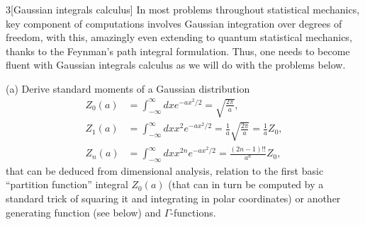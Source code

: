 \documentclass[12pt]{article}
\begin{document}
\begin{problem}{3}[Gaussian integrals calculus]
In most problems throughout statistical mechanics, key component of computations
involves Gaussian integration over degrees of freedom, with this, amazingly even
extending to quantum statistical mechanics, thanks to the Feynman's path
integral formulation. Thus, one needs to become fluent with Gaussian integrals
calculus as we will do with the problems below.

(a) Derive standard moments of a Gaussian distribution
\begin{subequations}
    \begin{align}
        Z_0(a)&=\int_{-\infty}^\infty dx
        e^{-ax^2/2}=\sqrt{\frac{2\pi}{a}},\label{p3a:Z0}\\
        Z_1(a)&=\int_{-\infty}^\infty dxx^2
        e^{-ax^2/2}=\frac1a\sqrt{\frac{2\pi}{a}}=\frac1aZ_0,\label{p3a:Z1}\\
        Z_n(a)&=\int_{-\infty}^\infty dx
        x^{2n}e^{-ax^2/2}=\frac{(2n-1)!!}{a^n}Z_0,\label{p3a:Zn}
    \end{align}
\end{subequations}
that can be deduced from dimensional analysis, relation to the first basic
``partition function'' integral $Z_0(a)$ (that can in turn be computed by a
standard trick of squaring it and integrating in polar coordinates) or another
generating function (see below) and $\Gamma$-functions.


\end{problem}
\end{document}
